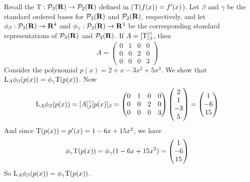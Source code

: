 \begin{example} \label{example 2.4.7}
Recall the \LTRAN{} \(\mathrm{T} : \mathcal{P}_3(\mathbf{R}) \to \mathcal{P}_2(\mathbf{R})\) defined in  (\(\mathrm{T}(f(x)) = f'(x)\)).
Let \(\beta\) and \(\gamma\) be the standard ordered bases for \(\mathcal{P}_3(\mathbf{R})\) and \(\mathcal{P}_2(\mathbf{R})\), respectively,
and let \(\phi_{\beta} : \mathcal{P}_3(\mathbf{R}) \to \mathbf{R}^4\) and \(\phi_{\gamma} : \mathcal{P}_2(\mathbf{R}) \to \mathbf{R}^3\) be the corresponding standard representations of \(\mathcal{P}_3(\mathbf{R})\) and \(\mathcal{P}_2(\mathbf{R})\).
If \(A = [\mathrm{T}]_{\beta}^{\gamma}\), then
\[
    A = \begin{pmatrix} 0 & 1 & 0 & 0 \\ 0 & 0 & 2 & 0 \\ 0 & 0 & 0 & 3 \end{pmatrix}
\]
Consider the polynomial \(p(x) = 2 + x - 3x^2 + 5x^3\).
We show that \(\mathrm{L}_A \phi_{\beta} (p(x)) = \phi_{\gamma} \mathrm{T} (p(x))\).
Now
\[
    \mathrm{L}_A \phi_{\beta} (p(x)) = [A]_{\beta}^{\gamma} [p(x)]_{\beta} 
    = \begin{pmatrix} 0 & 1 & 0 & 0 \\ 0 & 0 & 2 & 0 \\ 0 & 0 & 0 & 3 \end{pmatrix} \begin{pmatrix} 2 \\ 1 \\ -3 \\ 5 \end{pmatrix} = \begin{pmatrix} 1 \\ -6 \\ 15 \end{pmatrix}
\]
And since \(\mathrm{T}(p(x)) = p'(x) = 1 - 6x + 15x^2\), we have
\[
    \phi_{\gamma} \mathrm{T} (p(x)) = \phi_{\gamma} (1 - 6x + 15 x^2) = \begin{pmatrix} 1 \\ -6 \\ 15 \end{pmatrix}
\]
So \(\mathrm{L}_A \phi_{\beta} (p(x)) = \phi_{\gamma} \mathrm{T} (p(x))\).
\end{example}
